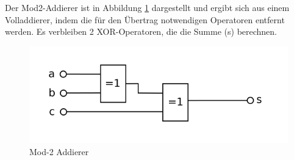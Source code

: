 Der Mod2-Addierer ist in Abbildung \ref{fig:lastadder} dargestellt und ergibt sich aus einem Volladdierer, indem die für den Übertrag notwendigen
Operatoren entfernt werden. Es verbleiben 2 XOR-Operatoren, die die Summe (s) berechnen.
\begin{figure}[!h]
  \centering
  \includegraphics[scale=1]{images/lastadder}
  \caption[Mod-2 Addierer]{Mod-2 Addierer\protect\footnotemark}
  \label{fig:lastadder}
\end{figure}
